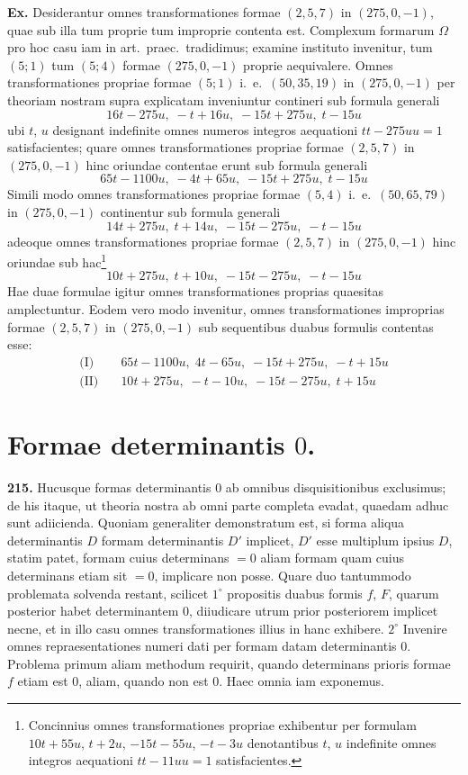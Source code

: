 \documentclass[12pt,a4paper]{article}
\theoremstyle{plain}
\theoremstyle{definition}
\theoremstyle{remark}
\begin{document}
\textbf{Ex.}
Desiderantur omnes transformationes formae $(2,5,7)$ in $(275,0,-1)$, quae sub illa tum proprie tum improprie contenta est. Complexum formarum $\Omega$ pro hoc casu iam in art.\ praec.\ tradidimus; examine instituto invenitur, tum $(5;1)$ tum $(5;4)$ formae $(275,0,-1)$ proprie aequivalere. Omnes transformationes propriae formae $(5;1)$ i.\ e.\ $(50,35,19)$ in $(275,0,-1)$ per theoriam nostram supra explicatam inveniuntur contineri sub formula generali
\[
16t-275u,\; -t+16u,\; -15t+275u,\; t-15u
\]
ubi $t$, $u$ designant indefinite omnes numeros integros aequationi $tt-275uu=1$ satisfacientes; quare omnes transformationes propriae formae $(2,5,7)$ in $(275,0,-1)$ hinc oriundae contentae erunt sub formula generali
\[
65t-1100u,\; -4t+65u,\; -15t+275u,\; t-15u
\]
Simili modo omnes transformationes propriae formae $(5,4)$ i.\ e.\ $(50,65,79)$ in $(275,0,-1)$ continentur sub formula generali
\[
14t+275u,\; t+14u,\; -15t-275u,\; -t-15u
\]
adeoque omnes transformationes propriae formae $(2,5,7)$ in $(275,0,-1)$ hinc oriundae sub hac\footnote{Concinnius omnes transformationes propriae exhibentur per formulam $10t+55u$, $t+2u$, $-15t-55u$, $-t-3u$ denotantibus $t$, $u$ indefinite omnes integros aequationi $tt-11uu=1$ satisfacientes.}
\[
10t+275u,\; t+10u,\; -15t-275u,\; -t-15u
\]
Hae duae formulae igitur omnes transformationes proprias quaesitas amplectuntur. Eodem vero modo invenitur, omnes transformationes improprias formae $(2,5,7)$ in $(275,0,-1)$ sub sequentibus duabus formulis contentas esse:
\begin{align*}
\text{(I)}\quad &65t-1100u,\; 4t-65u,\; -15t+275u,\; -t+15u \\
\text{(II)}\quad &10t+275u,\; -t-10u,\; -15t-275u,\; t+15u
\end{align*}


\section*{Formae determinantis $0$.}

\textbf{215.}
Hucusque formas determinantis $0$ ab omnibus disquisitionibus exclusimus; de his itaque, ut theoria nostra ab omni parte completa evadat, quaedam adhuc sunt adiicienda. Quoniam generaliter demonstratum est, si forma aliqua determinantis $D$ formam determinantis $D'$ implicet, $D'$ esse multiplum ipsius $D$, statim patet, formam cuius determinans $=0$ aliam formam quam cuius determinans etiam sit $=0$, implicare non posse. Quare duo tantummodo problemata solvenda restant, scilicet $1^\circ$ propositis duabus formis $f$, $F$, quarum posterior habet determinantem $0$, diiudicare utrum prior posteriorem implicet necne, et in illo casu omnes transformationes illius in hanc exhibere. $2^\circ$ Invenire omnes repraesentationes numeri dati per formam datam determinantis $0$. Problema primum aliam methodum requirit, quando determinans prioris formae $f$ etiam est $0$, aliam, quando non est $0$. Haec omnia iam exponemus.
\end{document}

